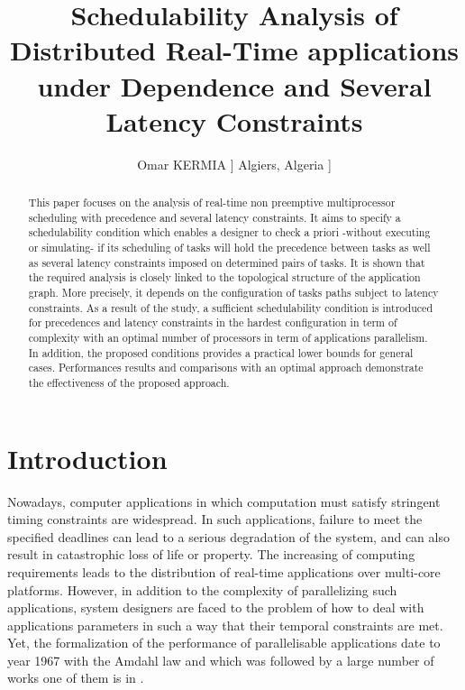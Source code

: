 \documentclass{ijcaArticle}
\begin{document}
\title{Schedulability Analysis of Distributed Real-Time applications under Dependence and Several Latency Constraints}


\author{ 
   \large Omar KERMIA \-3pt]
    \normalsize Algiers, Algeria \-3pt]
   }


\maketitle

\begin{abstract}
This paper focuses on the analysis of  real-time non
 preemptive multiprocessor scheduling with
precedence and several latency constraints.
 It aims to specify a schedulability condition which 
 enables a designer to check a priori -without executing or simulating-
  if its scheduling of
tasks will hold the precedence between tasks as well as several latency constraints imposed on determined pairs of tasks. 
It is shown that the required analysis is closely linked to the topological structure of the application graph. More precisely, it depends on the
configuration of tasks paths subject to latency constraints.
As a result of the study, a sufficient schedulability condition is introduced for precedences and latency constraints in the hardest configuration in term of complexity with an optimal number of processors in term of applications parallelism. In addition, the proposed conditions provides a practical lower bounds for general cases.  
Performances results and  comparisons with an optimal approach demonstrate the effectiveness of the proposed approach.   
\end{abstract}




\section{Introduction}
\label{}
Nowadays, computer applications in which computation must satisfy stringent timing constraints are widespread. In such applications, failure to meet the specified
deadlines can lead to a serious degradation of the system, and can also result in catastrophic loss of life or property. The increasing of computing requirements leads to the distribution 
of real-time applications over multi-core platforms. However, in addition to the complexity of parallelizing such applications, system designers  are faced to the problem of how to deal with applications parameters in such a way that their temporal constraints are met. Yet, the formalization of the performance of parallelisable applications date to year 1967 with the Amdahl law \cite{Amdahl67} and which was followed by a large number of works one of them is in \cite{Shi1996}.      
\end{document}
